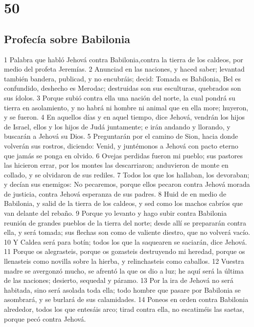 \chapter{50}

\section*{Profecía sobre Babilonia}

1 Palabra que habló Jehová contra Babilonia,contra la tierra de los caldeos, por medio del profeta Jeremías.
2 Anunciad en las naciones, y haced saber; levantad también bandera, publicad, y no encubráis; decid: Tomada es Babilonia, Bel es confundido, deshecho es Merodac; destruidas son sus esculturas, quebrados son sus ídolos.
3 Porque subió contra ella una nación del norte, la cual pondrá su tierra en asolamiento, y no habrá ni hombre ni animal que en ella more; huyeron, y se fueron.
4 En aquellos días y en aquel tiempo, dice Jehová, vendrán los hijos de Israel, ellos y los hijos de Judá juntamente; e irán andando y llorando, y buscarán a Jehová su Dios.
5 Preguntarán por el camino de Sion, hacia donde volverán sus rostros, diciendo: Venid, y juntémonos a Jehová con pacto eterno que jamás se ponga en olvido.
6 Ovejas perdidas fueron mi pueblo; sus pastores las hicieron errar, por los montes las descarriaron; anduvieron de monte en collado, y se olvidaron de sus rediles.
7 Todos los que los hallaban, los devoraban; y decían sus enemigos: No pecaremos, porque ellos pecaron contra Jehová morada de justicia, contra Jehová esperanza de sus padres.
8 Huid de en medio de Babilonia, y salid de la tierra de los caldeos, y sed como los machos cabríos que van delante del rebaño.
9 Porque yo levanto y hago subir contra Babilonia reunión de grandes pueblos de la tierra del norte; desde allí se prepararán contra ella, y será tomada; sus flechas son como de valiente diestro, que no volverá vacío.
10 Y Caldea será para botín; todos los que la saquearen se saciarán, dice Jehová.
11 Porque os alegrasteis, porque os gozasteis destruyendo mi heredad, porque os llenasteis como novilla sobre la hierba, y relinchasteis como caballos.
12 Vuestra madre se avergonzó mucho, se afrentó la que os dio a luz; he aquí será la última de las naciones; desierto, sequedal y páramo.
13 Por la ira de Jehová no será habitada, sino será asolada toda ella; todo hombre que pasare por Babilonia se asombrará, y se burlará de sus calamidades.
14 Poneos en orden contra Babilonia alrededor, todos los que entesáis arco; tirad contra ella, no escatiméis las saetas, porque pecó contra Jehová.
